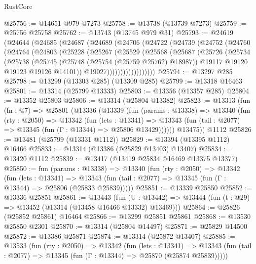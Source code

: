 \begin{lexlean}{RustCore}
\begin{coremodule}
@25756 := @14651 @979 @7273
@25758 := @13738 (@13739 @7273)
@25759 := @25756 @25758
@25762 := @13743 (@13745 @979 @31)
@25793 := @24619
    (@24644
      (@24685
        (@24687
          (@24689
            (@24706
              (@24722
                (@24739
                  (@24752
                    (@24760
                      (@24764
                        (@24803
                          (@25228
                            (@25267
                              (@25529
                                (@25568
                                  (@25687
                                    (@25726
                                      (@25734
                                        (@25738
                                          (@25745
                                            (@25748 (@25754 (@25759 @25762) @18987))
                                            @19117
                                            @19120
                                            @19123
                                            @19126
                                            @14101))
                                        @19027))))))))))))))))))
@25794 := @13297 @285
@25798 := @13299 (@13303 @285) (@13309 @285)
@25799 := @13318 @16463
@25801 := @13314 (@25799 @13333)
@25803 := @13356 (@13357 @285)
@25804 := @13352 @25803
@25806 := @13314 (@25804 @13382)
@25823 := @13313
    (fun (fn : @7) =>
    @25801
      (@13336
        (@13339
          (fun (params : @13338) =>
          @13340
            (fun (rty : @2050) =>
            @13342
              (fun (lets : @13341) =>
              @13343 (fun (tail : @2077) => @13345 (fun (Γ : @13344) => @25806 @13429))))))
        @13475))
    @1112
@25826 := @13481 (@25799 (@13331 @1112))
@25829 := @13394 (@13395 @1112) @16466
@25833 := @13314 (@13386 (@25829 @13403) @13407)
@25834 := @13420 @1112
@25839 := @13417 (@13419 @25834 @16469 @13375 @13377)
@25850 := fun (params : @13338) =>
  @13340
    (fun (rty : @2050) =>
    @13342
      (fun (lets : @13341) =>
      @13343 (fun (tail : @2077) => @13345 (fun (Γ : @13344) => @25806 (@25833 @25839)))))
@25851 := @13339 @25850
@25852 := @13336 @25851
@25861 := @13443
    (fun (U : @13442) => @13444 (fun (t : @29) => @13452 (@13314 (@13458 @16466 @13332) @13469)))
@25864 := @25826 (@25852 @25861) @16464
@25866 := @13299 @25851 @25861
@25868 := @13530 @25850 @2301
@25870 := @13314 (@25804 @14497)
@25871 := @25829 @14500
@25872 := @13386 @25871
@25874 := @13314 (@25872 @13407)
@25885 := @13533
    (fun (rty : @2050) =>
    @13342
      (fun (lets : @13341) =>
      @13343 (fun (tail : @2077) => @13345 (fun (Γ : @13344) => @25870 (@25874 @25839)))))

\end{coremodule}
\end{lexlean}
